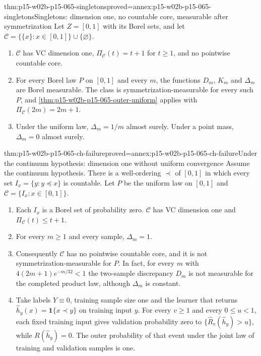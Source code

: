 \begin{hbtheorem}{thm:p15-w02b-p15-065-singletons}{proved=annex:p15-w02b-p15-065-singletons}{Singletons: dimension one, no countable core, measurable after symmetrization}
Let \(Z=[0,1]\) with its Borel sets, and let
\(\mathcal C=\{\{x\}:x\in[0,1]\}\cup\{\varnothing\}\).
\begin{enumerate}
\item \(\mathcal C\) has VC dimension one, \(\Pi_{\mathcal C}(t)=t+1\) for
      \(t\geq1\), and no pointwise countable core.
\item For every Borel law \(P\) on \([0,1]\) and every \(m\), the functions
      \(D_m\), \(K_m\) and \(\Delta_m\) are Borel measurable. The class is
      symmetrization-\allowbreak measurable for every such \(P\), and
      \cref{thm:p15-w02b-p15-065-outer-uniform} applies with
      \(\Pi_{\mathcal C}(2m)=2m+1\).
\item Under the uniform law, \(\Delta_m=1/m\) almost surely. Under a point
      mass, \(\Delta_m=0\) almost surely.
\end{enumerate}
\end{hbtheorem}

\begin{hbtheorem}{thm:p15-w02b-p15-065-ch-failure}{proved=annex:p15-w02b-p15-065-ch-failure}{Under the continuum hypothesis: dimension one without uniform convergence}
Assume the continuum hypothesis. There is a well-ordering \(\prec\) of
\([0,1]\) in which every set \(I_x=\{y:y\preceq x\}\) is countable. Let
\(P\) be the uniform law on \([0,1]\) and
\(\mathcal C=\{I_x:x\in[0,1]\}\).
\begin{enumerate}
\item Each \(I_x\) is a Borel set of probability zero. \(\mathcal C\) has
      VC dimension one and \(\Pi_{\mathcal C}(t)\leq t+1\).
\item For every \(m\geq1\) and every sample, \(\Delta_m=1\).
\item Consequently \(\mathcal C\) has no pointwise countable core, and it is
      not symmetrization-\allowbreak measurable for \(P\). In fact, for every \(m\)
      with \(4(2m+1)e^{-m/32}<1\) the two-sample discrepancy \(D_m\) is
      not measurable for the completed product law, although \(\Delta_m\)
      is constant.
\item Take labels \(Y\equiv0\), training sample size one and the learner
      that returns \(\widehat h_y(x)=\mathbf1\{x\prec y\}\) on training
      input \(y\). For every \(v\geq1\) and every \(0\leq u<1\), each fixed
      training input gives validation probability zero to
      \(\{\widehat R_v(\widehat h_y)>u\}\), while
      \(R(\widehat h_y)=0\). The outer probability of that event under the
      joint law of training and validation samples is one.
\end{enumerate}
\end{hbtheorem}

